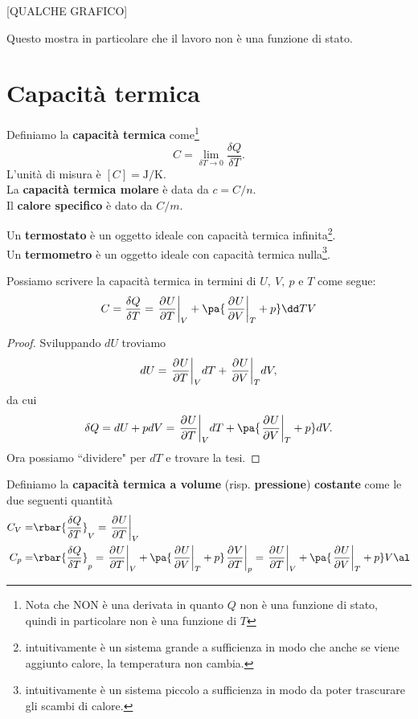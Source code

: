 [QUALCHE GRAFICO]

\noindent
Questo mostra in particolare che il lavoro non \`e una funzione di stato.

\section{Capacit\`a termica}
\begin{definition}
Definiamo la \textbf{capacit\`a termica} come\footnote{Nota che NON \`e una derivata in quanto $Q$ non \`e una funzione di stato, quindi in particolare non \`e una funzione di $T$}
\[C=\lim_{\delta T\to 0}\frac{\delta Q}{\delta T}.\]
L'unit\`a di misura \`e $[C]=\mathrm{J}/\mathrm{K}$.\\
La \textbf{capacit\`a termica molare} \`e data da $c=C/n$.\\
Il \textbf{calore specifico} \`e dato da $C/m$.
\end{definition}

\begin{definition}
Un \textbf{termostato} \`e un oggetto ideale con capacit\`a termica infinita\footnote{intuitivamente \`e un sistema grande a sufficienza in modo che anche se viene aggiunto calore, la temperatura non cambia.}.\\ 
Un \textbf{termometro} \`e un oggetto ideale con capacit\`a termica nulla\footnote{intuitivamente \`e un sistema piccolo a sufficienza in modo da poter trascurare gli scambi di calore.}.
\end{definition}

\begin{remark}
Possiamo scrivere la capacit\`a termica in termini di $U,\ V,\ p$ e $T$ come segue:
\[C=\frac{\delta Q}{\delta T}=\ppb TUV+\pa{\ppb VUT+p}\dd TV\]
\end{remark}
\begin{proof}
Sviluppando $dU$ troviamo
\[dU=\ppb TUVdT+\ppb VUTdV,\]
da cui
\[\delta Q=dU+pdV=\ppb TUVdT+\pa{\ppb VUT+p}dV.\]
Ora possiamo ``dividere" per $dT$ e trovare la tesi.
\end{proof}

\begin{definition}
Definiamo la \textbf{capacit\`a termica a volume} (risp. \textbf{pressione}) \textbf{costante} come le due seguenti quantit\`a
\begin{align*}
C_V=&\rbar{\frac{\delta Q}{\delta T}}_V=\ppb TUV\\
C_p=&\rbar{\frac{\delta Q}{\delta T}}_p=\ppb TUV +\pa{\ppb VUT+p}\ppb TVp=\ppb TUV +\pa{\ppb VUT+p}V\al
\end{align*}
\end{definition}

